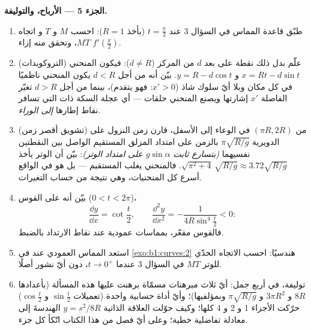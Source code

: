 \begin{problem}
\medskip
\noindent\textbf{الجزء 5 --- الأرباح، والتوليفة.}
\begin{enumerate}[resume]
  \item طبّق قاعدة المماس في السؤال 3 عند $t =
        \frac\pi2$ (بأخذ $R = 1$): احسب $M$ و $T$ و
        اتجاه $MT$، وتحقق منه إزاء
        $f'(\frac\pi2)$.
  \item (التروكويدات) علّم بدل ذلك نقطة على بعد $d$ من
        المركز ($d \neq R$): فيكون المنحني $x = Rt -
        d\sin t$ و $y = R - d\cos t$. بيّن أنه من أجل $d < R$ يكون
        المنحني ناظميًا في كل مكان وبلا أيّ سلوك شاذ
        ($x' > 0$: فهو يتقدم)، بينما من أجل $d
        > R$ تغيّر الفاصلة $x'$ إشارتها ويصنع المنحني
        حلقات --- أي عجلة السكة ذات  التي تسافر نقاط
        إطارها \emph{إلى الوراء}.
  \item (تشويق أقصر زمن) من  $(\pi R, 2R)$ في
        الوعاء إلى الأسفل، قارن زمن النزول على الدويرية
        $\pi\sqrt{R/g}$ بالزمن على امتداد المزلق المستقيم
        الواصل بين النقطتين نفسيهما \emph{(بتسارع ثابت
        $g\sin\alpha$ على امتداد الوتر)}: بيّن أن الوتر يأخذ
        $\sqrt{\pi^2 + 4}\,\sqrt{R/g} \approx 3.72\sqrt{R/g}$.
        فالمنحني يغلب المستقيم --- بل هو في الواقع أسرع
        كل المنحنيات، وهي نتيجة من حساب التغيرات.
  \item بيّن أنه على القوس ($0 < t < 2\pi$)،
        \[
        \frac{\dd y}{\dd x} = \cot\frac t2,
        \qquad
        \frac{\dd^2 y}{\dd x^2} =
        -\frac{1}{4R\sin^4\frac t2} < 0 :
        \]
        فالقوس مقعّر، بمماسات عمودية عند نقاط
        الارتداد بالضبط.
  \item استعد المماس العمودي عند  في
        \cref{exo:b1:curves:2} هندسيًا: احسب الاتجاه الحدّي
        للوتر $MT$ في السؤال 3 عندما $t \to
        0^{+}$، دون أيّ نشور أصلًا.
  \item توليفة، في أربع جمل: أيّ ثلاث مبرهنات مسمّاة
        برهنت عليها هذه المسألة (بأعدادها $8R$ و $3\pi
        R^2$ و $\pi\sqrt{R/g}$ وبمؤلفيها)؛ وأيّ أداة حسابية
        واحدة (تعميلات $\sin\frac t2$ و $\cos\frac t2$)
        حرّكت الأجزاء 1 و 2 و 4 كلها؛ وكيف حوّلت
        العلاقة الذاتية $y = s^2/8R$ الهندسةَ
        إلى معادلة تفاضلية خطية؛ وعلى أيّ فصل
        من هذا الكتاب اتّكأ كل جزء.
\end{enumerate}
\end{problem}
